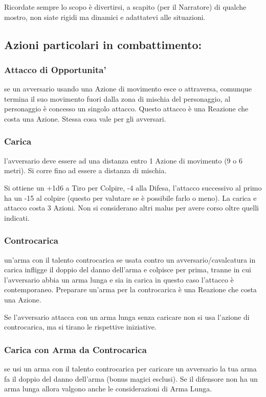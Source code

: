 \documentclass[a4paper,11pt,twoside,openany]{book}
\begin{document}
\bigskip
Ricordate sempre lo scopo è divertirsi, a scapito (per il Narratore) di qualche mostro, non siate rigidi ma dinamici e adattatevi alle situazioni.

\subsection{Azioni particolari in combattimento:}

\subsubsection{Attacco di Opportunita'} se un avversario usando una Azione di movimento esce o attraversa, comunque termina il suo movimento fuori dalla zona di mischia del personaggio, al personaggio è concesso un singolo attacco. Questo attacco è una Reazione che costa una Azione. Stessa cosa vale per gli avversari.

\subsubsection{Carica} l'avversario deve essere ad una distanza entro 1 Azione di movimento (9 o 6 metri). Si corre fino ad essere a distanza di mischia.

Si ottiene un +1d6 a Tiro per Colpire, -4 alla Difesa, l'attacco successivo al primo ha un -15 al colpire (questo per valutare se è possibile farlo o meno). La carica e attacco costa 3 Azioni. Non si considerano altri malus per avere corso oltre quelli indicati.

\subsubsection{Controcarica} un'arma con il talento controcarica se usata contro un avversario/cavalcatura in carica infligge il doppio del danno dell'arma e colpisce per prima, tranne in cui l'avversario abbia un arma lunga e sia in carica in questo caso l'attacco è contemporaneo. Preparare un'arma per la controcarica è una Reazione che costa una Azione.

Se l'avversario attacca con un arma lunga senza caricare non si usa
l'azione di controcarica, ma si tirano le rispettive iniziative.

\subsubsection{Carica con Arma da Controcarica} se usi un arma con il talento controcarica per caricare un avversario la tua arma fa il doppio del danno dell'arma (bonus magici esclusi). Se il difensore non ha un arma lunga allora valgono anche le considerazioni di Arma Lunga.
\end{document}
